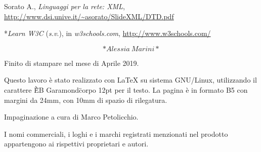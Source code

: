 \documentclass[
  b5paper,
  twoside,
  12pt,
  chapterprefix=false,
  bibliography=totocnumbered,
  parskip=false]{scrbook}
\begin{document}
Sorato A., \emph{Linguaggi per la rete: XML},
\url{http://www.dsi.unive.it/~asorato/SlideXML/DTD.pdf}

*\emph{Learn W3C} (\emph{s.v}.), in \emph{w3schools.com},
\url{http://www.w3schools.com/}

\[*Alessia~Marini*\]

\pagebreak
\afterpage{\newpage}
\pagebreak
\thispagestyle{empty}
\phantom{~}
\newpage
\clearpage
\afterpage{\newpage}
\thispagestyle{empty}

\vspace*{\fill}
\begin{center}
Finito di stampare nel mese di Aprile 2019.

\vspace{2em}

Questo  lavoro  è  stato  realizzato  con  LaTeX su sistema GNU/Linux, utilizzando il carattere \`\`EB Garamond\" corpo 12pt per il testo. La pagina è in formato B5 con margini da 24mm, con 10mm di spazio di rilegatura.


Impaginazione a cura di Marco Petolicchio.

\vspace{2em}


I nomi commerciali,  i loghi e i marchi registrati menzionati nel prodotto appartengono  ai  rispettivi  proprietari e autori.
\end{center}

\backmatter
\end{document}

